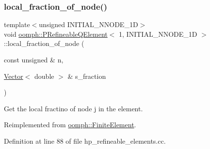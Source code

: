 \subsubsection{\texorpdfstring{local\+\_\+fraction\+\_\+of\+\_\+node()}{local\_fraction\_of\_node()}}
{\footnotesize\ttfamily template$<$unsigned I\+N\+I\+T\+I\+A\+L\+\_\+\+N\+N\+O\+D\+E\+\_\+1D$>$ \\
void \hyperlink{classoomph_1_1PRefineableQElement}{oomph\+::\+P\+Refineable\+Q\+Element}$<$ 1, I\+N\+I\+T\+I\+A\+L\+\_\+\+N\+N\+O\+D\+E\+\_\+1D $>$\+::local\+\_\+fraction\+\_\+of\+\_\+node (\begin{DoxyParamCaption}\item[{const unsigned \&}]{n,  }\item[{\hyperlink{classoomph_1_1Vector}{Vector}$<$ double $>$ \&}]{s\+\_\+fraction }\end{DoxyParamCaption})\hspace{0.3cm}{\ttfamily [virtual]}}



Get the local fractino of node j in the element. 



Reimplemented from \hyperlink{classoomph_1_1FiniteElement_a41640b9a9e5f6461cd8ebb8218502b07}{oomph\+::\+Finite\+Element}.



Definition at line 88 of file hp\+\_\+refineable\+\_\+elements.\+cc.

\mbox{\label{classoomph_1_1PRefineableQElement_3_011_00_01INITIAL__NNODE__1D_01_4_a0e1f2721aee7d97a66a8380f4d0b23a6}} 
